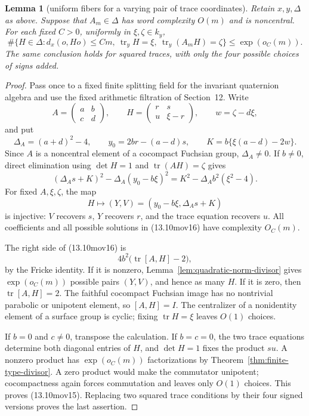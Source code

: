 \documentclass[11pt,reqno]{amsart}
\newtheorem{lemma}[theorem]{Lemma}
\theoremstyle{definition}
\theoremstyle{remark}
\newcommand{\Tr}{\operatorname{tr}}
\begin{document}
\begin{lemma}[uniform fibers for a varying pair of trace coordinates]
\label{lem:moving-two-trace-fibers}
Retain \(x,y,\Delta\) as above.  Suppose that \(A_m\in\Delta\) has word
complexity \(O(m)\) and is noncentral.  For each fixed \(C>0\), uniformly
in \(\xi,\zeta\in k_y\),
\[
 \#\{H\in\Delta:d_x(o,Ho)\le Cm,
       \ \Tr_yH=\xi,\ \Tr_y(A_mH)=\zeta\}
 \le\exp(o_C(m)).
\tag{13.10mov15}
\]
The same conclusion holds for squared traces, with only the four possible
choices of signs added.
\end{lemma}

\begin{proof}
Pass once to a fixed finite splitting field for the invariant quaternion
algebra and use the fixed arithmetic filtration of Section~12.  Write
\[
 A=\begin{pmatrix}a&b\\c&d\end{pmatrix},\qquad
 H=\begin{pmatrix}r&s\\u&\xi-r\end{pmatrix},\qquad
 w=\zeta-d\xi,
\]
and put
\[
 \Delta_A=(a+d)^2-4,\qquad
 y_0=2br-(a-d)s,\qquad
 K=b\{\xi(a-d)-2w\}.
\]
Since \(A\) is a noncentral element of a cocompact Fuchsian group,
\(\Delta_A\ne0\).  If \(b\ne0\), direct elimination using
\(\det H=1\) and \(\Tr(AH)=\zeta\) gives
\[
 (\Delta_As+K)^2-\Delta_A(y_0-b\xi)^2
 =K^2-\Delta_Ab^2(\xi^2-4).
\tag{13.10mov16}
\]
For fixed \(A,\xi,\zeta\), the map
\[
 H\longmapsto(Y,V)=(y_0-b\xi,\Delta_As+K)
\]
is injective: \(V\) recovers \(s\), \(Y\) recovers \(r\), and the trace
equation recovers \(u\).  All coefficients and all possible solutions in
(13.10mov16) have complexity \(O_C(m)\).

The right side of (13.10mov16) is
\[
 4b^2\bigl(\Tr[A,H]-2\bigr),
\tag{13.10mov17}
\]
by the Fricke identity.  If it is nonzero,
Lemma~\ref{lem:quadratic-norm-divisor} gives \(\exp(o_C(m))\) possible
pairs \((Y,V)\), and hence as many \(H\).  If it is zero, then
\(\Tr[A,H]=2\).  The faithful cocompact Fuchsian image has no nontrivial
parabolic or unipotent element, so \([A,H]=I\).  The centralizer of a
nonidentity element of a surface group is cyclic; fixing \(\Tr H=\xi\)
leaves \(O(1)\) choices.

If \(b=0\) and \(c\ne0\), transpose the calculation.  If \(b=c=0\), the
two trace equations determine both diagonal entries of \(H\), and
\(\det H=1\) fixes the product \(su\).  A nonzero product has
\(\exp(o_C(m))\) factorizations by
Theorem~\ref{thm:finite-type-divisor}.  A zero product would make the
commutator unipotent; cocompactness again forces commutation and leaves
only \(O(1)\) choices.  This proves (13.10mov15).  Replacing two squared
trace conditions by their four signed versions proves the last assertion.
\end{proof}
\end{document}

